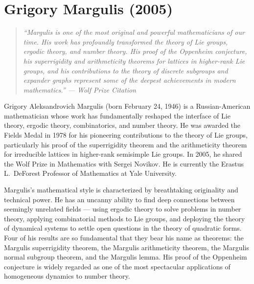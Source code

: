\let\R\relax
\newcommand{\R}{\mathbb{R}}
\let\C\relax
\newcommand{\C}{\mathbb{C}}
\let\N\relax
\newcommand{\N}{\mathbb{N}}
\let\Z\relax
\newcommand{\Z}{\mathbb{Z}}
\let\Q\relax
\newcommand{\Q}{\mathbb{Q}}
\let\A\relax
\newcommand{\A}{\mathbb{A}}
\let\F\relax
\newcommand{\F}{\mathbb{F}}
\let\SL\relax
\newcommand{\SL}{\operatorname{SL}}
\let\GL\relax
\newcommand{\GL}{\operatorname{GL}}
\let\SO\relax
\newcommand{\SO}{\operatorname{SO}}
\let\SU\relax
\newcommand{\SU}{\operatorname{SU}}
\let\Sp\relax
\newcommand{\Sp}{\operatorname{Sp}}
\let\PSL\relax
\newcommand{\PSL}{\operatorname{PSL}}
\let\Ad\relax
\newcommand{\Ad}{\operatorname{Ad}}
\let\Hom\relax
\newcommand{\Hom}{\operatorname{Hom}}
\let\Aut\relax
\newcommand{\Aut}{\operatorname{Aut}}
\let\End\relax
\newcommand{\End}{\operatorname{End}}
\let\Lie\relax
\newcommand{\Lie}{\operatorname{Lie}}
\let\Gal\relax
\newcommand{\Gal}{\operatorname{Gal}}
\let\vol\relax
\newcommand{\vol}{\operatorname{vol}}

\chapter{Grigory Margulis (2005)}

\begin{quote}
\it ``Margulis is one of the most original and powerful mathematicians of our time. His work has profoundly transformed the theory of Lie groups, ergodic theory, and number theory. His proof of the Oppenheim conjecture, his superrigidity and arithmeticity theorems for lattices in higher-rank Lie groups, and his contributions to the theory of discrete subgroups and expander graphs represent some of the deepest achievements in modern mathematics.'' --- Wolf Prize Citation
\end{quote}

Grigory Aleksandrovich Margulis (born February 24, 1946) is a Russian-American mathematician whose work has fundamentally reshaped the interface of Lie theory, ergodic theory, combinatorics, and number theory. He was awarded the Fields Medal in 1978 for his pioneering contributions to the theory of Lie groups, particularly his proof of the superrigidity theorem and the arithmeticity theorem for irreducible lattices in higher-rank semisimple Lie groups. In 2005, he shared the Wolf Prize in Mathematics with Sergei Novikov. He is currently the Erastus L.\ DeForest Professor of Mathematics at Yale University.

Margulis's mathematical style is characterized by breathtaking originality and technical power. He has an uncanny ability to find deep connections between seemingly unrelated fields --- using ergodic theory to solve problems in number theory, applying combinatorial methods to Lie groups, and deploying the theory of dynamical systems to settle open questions in the theory of quadratic forms. Four of his results are so fundamental that they bear his name as theorems: the Margulis superrigidity theorem, the Margulis arithmeticity theorem, the Margulis normal subgroup theorem, and the Margulis lemma. His proof of the Oppenheim conjecture is widely regarded as one of the most spectacular applications of homogeneous dynamics to number theory.

